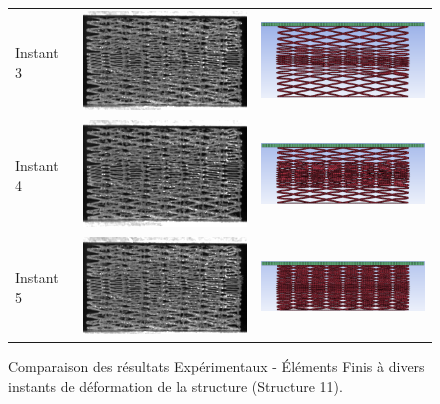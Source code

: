 \documentclass[a4paper]{article}
\begin{document}
\begin{figure}[!h]
\begin{tabular}{m{3cm}m{6cm}m{6cm}}
			Instant 3 & \includegraphics[width=5cm]{Images/8/8_3/exp4.png} & \includegraphics[width=5cm]{Images/8/8_3/ef4.png}\\
			Instant 4 & \includegraphics[width=5cm]{Images/8/8_3/exp5.png} & \includegraphics[width=5cm]{Images/8/8_3/ef5.png}\\
			Instant 5 & \includegraphics[width=5cm]{Images/8/8_3/exp6.png} & \includegraphics[width=5cm]{Images/8/8_3/ef6.png}\\
		\end{tabular}
		\caption{Comparaison des résultats Expérimentaux - Éléments Finis à divers instants de déformation de la structure (Structure 11).}
		\label{exp_vs_ef}
	\end{figure}
	
\end{document}
